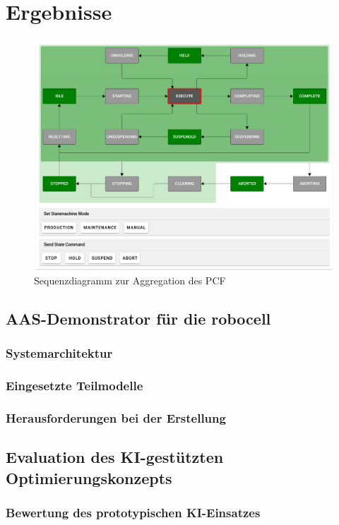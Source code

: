 \section{Ergebnisse}
\newpage
\begin{figure}[htbp]
    \centering
        \includegraphics[width=1\textwidth]{Bilder/Ergebnisse/2025-07-23_15-06.png}
    
    \caption{Sequenzdiagramm zur Aggregation des PCF}
    \label{fig:SequenzdiagrammPCF}
\end{figure}

\subsection{AAS-Demonstrator für die robocell}
\subsubsection{Systemarchitektur}
\subsubsection{Eingesetzte Teilmodelle}
\subsubsection{Herausforderungen bei der Erstellung}
\subsection{Evaluation des KI-gestützten Optimierungskonzepts}
\subsubsection{Bewertung des prototypischen KI-Einsatzes}

